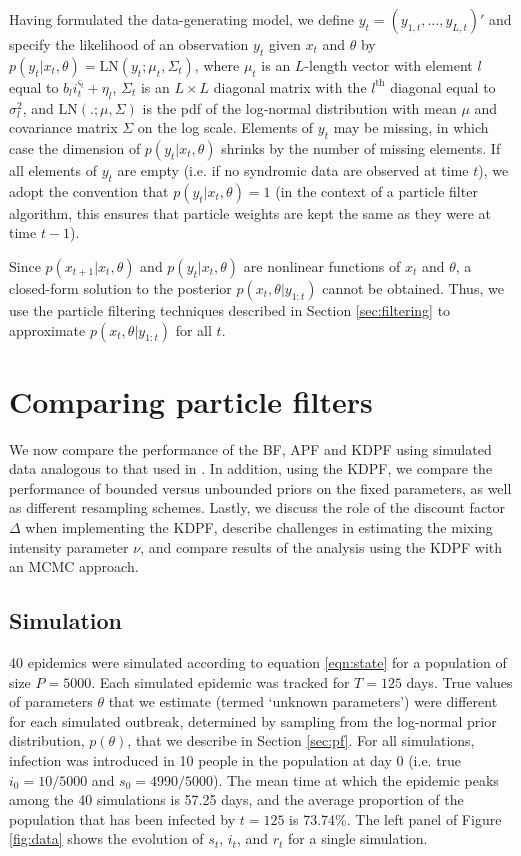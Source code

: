 \documentclass{elsarticle}
\begin{document}
Having formulated the data-generating model, we define $y_t = (y_{1,t},\ldots,y_{L,t})'$ and specify the likelihood of an observation $y_t$ given $x_t$ and $\theta$ by $p(y_t|x_t,\theta) = \mbox{LN}(y_t;\mu_t,\Sigma_t)$, where $\mu_t$ is an $L$-length vector with element $l$ equal to $b_li_t^{\varsigma_l} + \eta_l$, $\Sigma_t$ is an $L \times L$ diagonal matrix with the $l^{\mbox{th}}$ diagonal equal to $\sigma_l^2$, and $\mbox{LN}(.;\mu,\Sigma)$ is the pdf of the log-normal distribution with mean $\mu$ and covariance matrix $\Sigma$ on the log scale. Elements of $y_t$ may be missing, in which case the dimension of $p(y_t|x_t,\theta)$ shrinks by the number of missing elements. If all elements of $y_t$ are empty (i.e. if no syndromic data are observed at time $t$), we adopt the convention that $p(y_t|x_t,\theta) = 1$ (in the context of a particle filter algorithm, this ensures that particle weights are kept the same as they were at time $t-1$).

Since $p(x_{t+1}|x_t,\theta)$ and $p(y_t|x_t,\theta)$ are nonlinear functions of $x_t$ and $\theta$, a closed-form solution to the posterior $p(x_t,\theta|y_{1:t})$ cannot be obtained. Thus, we use the particle filtering techniques described in Section \ref{sec:filtering} to approximate $p(x_t,\theta|y_{1:t})$ for all $t$.

\section{Comparing particle filters} \label{sec:results}

We now compare the performance of the BF, APF and KDPF using simulated data analogous to that used in \citep{skvortsov2012monitoring}. In addition, using the KDPF, we compare the performance of bounded versus unbounded priors on the fixed parameters, as well as different resampling schemes. Lastly, we discuss the role of the discount factor $\Delta$ when implementing the KDPF, describe challenges in estimating the mixing intensity parameter $\nu$, and compare results of the analysis using the KDPF with an MCMC approach.

\subsection{Simulation}

40 epidemics were simulated according to equation \eqref{eqn:state} for a population of size $P = 5000$. Each simulated epidemic was tracked for $T = 125$ days. True values of parameters $\theta$ that we estimate (termed `unknown parameters') were different for each simulated outbreak, determined by sampling from the log-normal prior distribution, $p(\theta)$, that we describe in Section \ref{sec:pf}. For all simulations, infection was introduced in 10 people in the population at day 0 (i.e. true $i_0 = 10/5000$ and $s_0 = 4990/5000$). The mean time at which the epidemic peaks among the 40 simulations is 57.25 days, and the average proportion of the population that has been infected by $t = 125$ is 73.74\%. The left panel of Figure \ref{fig:data} shows the evolution of $s_t$, $i_t$, and $r_t$ for a single simulation.
\end{document}
